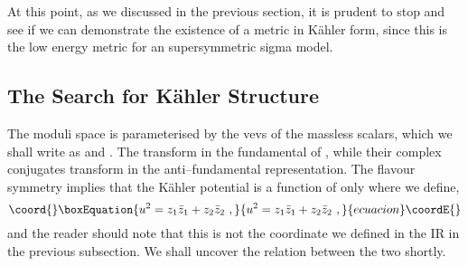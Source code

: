\documentclass[a4paper,12pt]{article}
\begin{document}
At this point, as we discussed in the previous section, it is prudent
to stop and see if we can demonstrate the existence of a metric in
K\"ahler form, since this is the low energy metric for an \coordHE{}
supersymmetric sigma model.


\subsection{The Search for K\"ahler Structure}



\label{sec:general1}

The moduli space is parameterised by the vevs of the massless scalars,
which we shall write as \coordHE{} and \coordHE{}.  The \coordHE{} transform in the
fundamental of \coordHE{}, while their complex conjugates transform in
the anti--fundamental representation.  The \coordHE{} flavour symmetry
implies that the K\"ahler potential is a function of \coordHE{} only where
we define,
\begin{equation}\coord{}\boxEquation{
  u^2 = z_1 \bar{z}_1 + z_2 \bar{z}_2 \ ,
}{
  u^2 = z_1 \bar{z}_1 + z_2 \bar{z}_2 \ ,
}{ecuacion}\coordE{}\end{equation}
and the reader should note that this is not the coordinate \coordHE{} we
defined in the IR in the previous subsection. We shall uncover the
relation between the two shortly.
\end{document}

